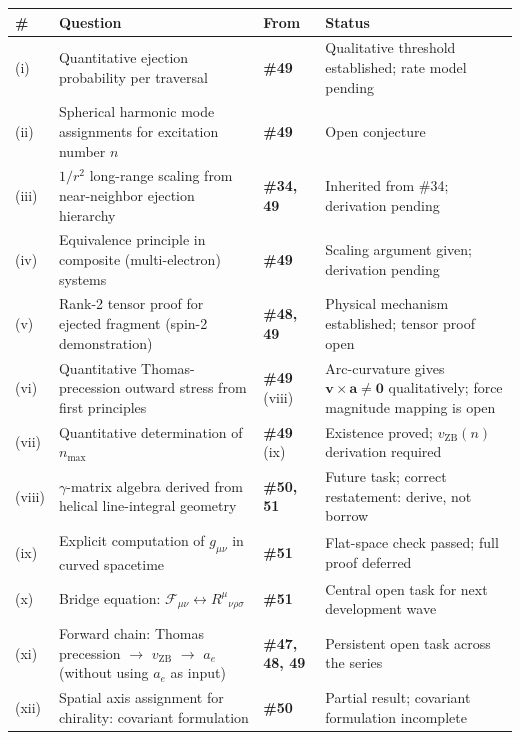 \documentclass[12pt,letterpaper]{article}
\newcommand{\paperno}[1]{\textbf{\#{}#1}}
\newcommand{\vZB}{v_{\mathrm{ZB}}}
\begin{document}
\begin{longtable}{p{0.5cm}p{6.0cm}p{2.0cm}p{4.5cm}}
\toprule
\textbf{\#} & \textbf{Question} & \textbf{From} & \textbf{Status} \\
\midrule
\endhead
(i) & Quantitative ejection probability per traversal &
  \paperno{49} & Qualitative threshold established; rate model pending \\
\addlinespace[0.3cm]
(ii) & Spherical harmonic mode assignments for excitation number $n$ &
  \paperno{49} & Open conjecture \\
\addlinespace[0.3cm]
(iii) & $1/r^2$ long-range scaling from near-neighbor ejection hierarchy &
  \paperno{34, 49} & Inherited from \#34; derivation pending \\
\addlinespace[0.3cm]
(iv) & Equivalence principle in composite (multi-electron) systems &
  \paperno{49} & Scaling argument given; derivation pending \\
\addlinespace[0.3cm]
(v) & Rank-2 tensor proof for ejected fragment (spin-2 demonstration) &
  \paperno{48, 49} & Physical mechanism established; tensor proof open \\
\addlinespace[0.3cm]
(vi) & Quantitative Thomas-precession outward stress from first principles &
  \paperno{49} (viii) & Arc-curvature gives $\mathbf{v}\times\mathbf{a}\neq\mathbf{0}$
                         qualitatively; force magnitude mapping is open \\
\addlinespace[0.3cm]
(vii) & Quantitative determination of $n_{\max}$ &
  \paperno{49} (ix) & Existence proved; $\vZB(n)$ derivation required \\
\addlinespace[0.3cm]
(viii) & $\gamma$-matrix algebra derived from helical line-integral geometry &
  \paperno{50, 51} & Future task; correct restatement: derive, not borrow \\
\addlinespace[0.3cm]
(ix) & Explicit computation of $g_{\mu\nu}$ in curved spacetime &
  \paperno{51} & Flat-space check passed; full proof deferred \\
\addlinespace[0.3cm]
(x) & Bridge equation: $\mathcal{F}_{\mu\nu} \leftrightarrow R^\mu{}_{\nu\rho\sigma}$ &
  \paperno{51} & Central open task for next development wave \\
\addlinespace[0.3cm]
(xi) & Forward chain: Thomas precession $\to$ $\vZB$ $\to$ $a_e$
       (without using $a_e$ as input) &
  \paperno{47, 48, 49} & Persistent open task across the series \\
\addlinespace[0.3cm]
(xii) & Spatial axis assignment for chirality: covariant formulation &
  \paperno{50} & Partial result; covariant formulation incomplete \\

\end{longtable}
\end{document}
